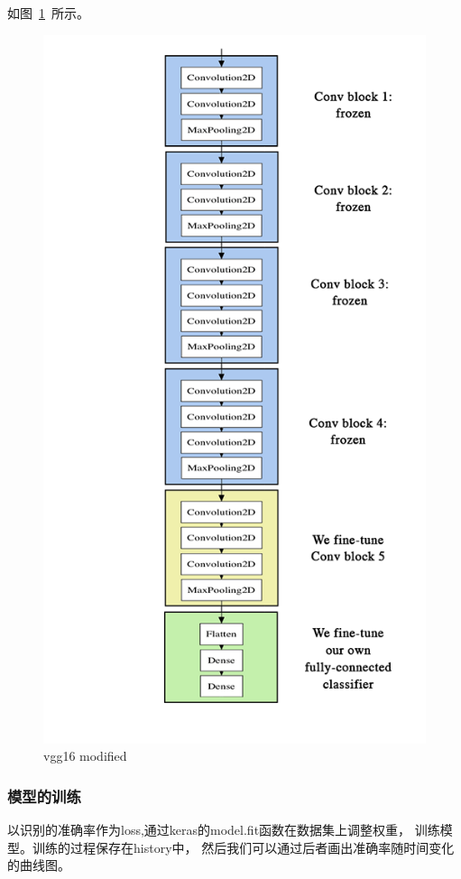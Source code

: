 如图~\ref{vgg16modified}~所示。
\begin{figure}[!htbp]
	\centering	\includegraphics[width=12cm]{pic/assets/vgg16_modified}
    \caption{vgg16 modified}	\label{vgg16modified}	\end{figure}



\subsubsection{模型的训练}

以识别的准确率作为loss,通过keras的model.fit函数在数据集上调整权重，
训练模型。训练的过程保存在history中，
然后我们可以通过后者画出准确率随时间变化的曲线图。

